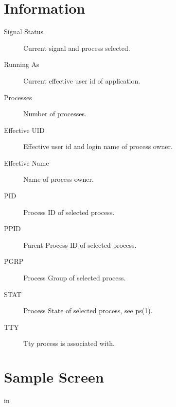 \section{Information}
\begin{description}
\item[Signal Status] Current signal and process selected.
\item[Running As] Current effective user id of application.
\item[Processes] Number of processes.
\item[Effective UID] Effective user id and login name of process owner.
\item[Effective Name] Name of process owner.
\item[PID] Process ID of selected process.
\item[PPID] Parent Process ID of selected process.
\item[PGRP] Process Group of selected process.
\item[STAT] Process State of selected process, see ps(1).
\item[TTY] Tty process is associated with.
\end{description}

\section{Sample Screen}

\newpage
{} in
\newpage

